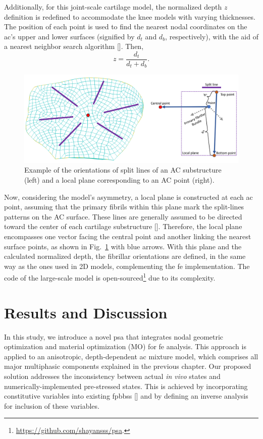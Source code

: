 \documentclass[12pt,a4paper]{report}
\begin{document}
Additionally, for this joint-scale cartilage model, the normalized depth $z$ definition is redefined to accommodate the knee models with varying thicknesses. The position of each point is used to find the nearest nodal coordinates on the \ac{ac}'s upper and lower surfaces (signified by $d_t$ and $d_b$, respectively), with the aid of a nearest neighbor search algorithm [\cite{maneewongvatana1999}]. Then, 
%
\begin{equation}
    z = \frac{ d_t }{ d_t+d_b }.
\end{equation}
%
\begin{figure}\centering
\includegraphics[width=\textwidth]{img/direction.jpg}
\caption{Example of the orientations of split lines of an AC substructure (left) and a local plane corresponding to an AC point (right).}
\label{fig:split_lines}
\end{figure}
%
Now, considering the model's asymmetry, a local plane is constructed at each \ac{ac} point, assuming that the primary fibrils within this plane mark the split-lines patterns on the AC surface. These lines are generally assumed to be directed toward the center of each cartilage substructure [\cite{mononen2012}]. Therefore, the local plane encompasses one vector facing the central point and another linking the nearest surface points, as shown in Fig.~\ref{fig:split_lines} with blue arrows. With this plane and the calculated normalized depth, the fibrillar orientations are defined, in the same way as the ones used in 2D models, complementing the \ac{fe} implementation. The code of the large-scale model is open-sourced\footnote{\href{https://github.com/shayansss/psa}{https://github.com/shayansss/psa}.} due to its complexity.

\section{Results and Discussion}
%
In this study, we introduce a novel \ac{psa} that integrates nodal geometric optimization and material optimization (MO) for \ac{fe} analysis. This approach is applied to an anisotropic, depth-dependent \ac{ac} mixture model, which comprises all major multiphasic components explained in the previous chapter. Our proposed solution addresses the inconsistency between actual \textit{in vivo} states and numerically-implemented pre-stressed states. This is achieved by incorporating constitutive variables into existing \acp{fpbbs} [\cite{wang2018,bols2013,pandolfi2008}] and by defining an inverse analysis for inclusion of these variables.
\end{document}
